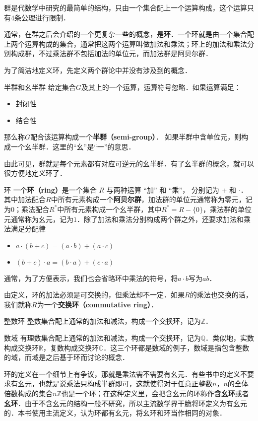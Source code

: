 

群是代数学中研究的最简单的结构，只由一个集合配上一个运算构成，这个运算只有$4$条公理进行限制．

通常，在群之后会介绍的一个更复杂一些的概念，是\textbf{环}．一个环就是由一个集合配上两个运算构成的集合，通常把这两个运算叫做加法和乘法；环上的加法和乘法分别构成群，不过乘法群不包括加法的单位元，而加法群是阿贝尔群．

为了简洁地定义环，先定义两个群论中并没有涉及到的概念．

\begin{definition}{半群和幺半群}
给定集合$G$及其上的一个运算，运算符号忽略．如果运算满足：
\begin{itemize}
\item 封闭性
\item 结合性
\end{itemize}
那么称$G$配合该运算构成一个\textbf{半群（semi-group）}．
如果半群中含单位元，则构成一个幺半群．这里的“幺”是“一”的意思．
\end{definition}

由此可见，群就是每个元素都有对应可逆元的幺半群．有了幺半群的概念，就可以很方便地定义环了．

\begin{definition}{环}
一个\textbf{环（ring）}是一个集合 $R$ 与两种运算 “加” 和 “乘”， 分别记为 $+$ 和 $\cdot$． 其中加法配合$R$中所有元素构成一个\textbf{阿贝尔群}，加法群的单位元通常称为零元，记为$0$；乘法配合$R^*$中所有元素构成一个幺半群，其中$R^*=R-\{0\}$，乘法群的单位元通常称为幺元，记为$1$．除了加法和乘法分别构成两个群之外，还要求加法和乘法满足分配律
\begin{itemize}
\item $a \cdot (b + c) = (a \cdot b) + (a \cdot c)$
\item $(b + c) \cdot a = (b \cdot a) + (c \cdot a)$
\end{itemize}
\end{definition}

通常，为了方便表示，我们也会省略环中乘法的符号，将$a\cdot b$写为$ab$．

由定义，环的加法必须是可交换的，但乘法却不一定．如果$R$的乘法也交换的话，我们就称$R$为一个\textbf{交换环（commutative ring）}．

\begin{example}{整数环}
整数集合配上通常的加法和减法，构成一个交换环，记为$\mathbb{Z}$．
\end{example}

\begin{example}{数域}
有理数集合配上通常的加法和减法，构成一个交换环，记为$\mathbb{Q}$．类似地，实数构成交换环$\mathbb{R}$，复数构成交换环$\mathbb{C}$．这三个环都是数域的例子，数域是指包含整数的域，而域是之后基于环而讨论的概念．
\end{example}

环的定义在一个细节上有争议，那就是乘法需不需要有幺元．有些书中的定义不要求有幺元，也就是说乘法只构成半群即可，这就使得对于任意正整数$n$，$n$的全体倍数构成的集合$n\mathbb{Z}$也是一个环；在这种定义里，会把含幺元的环称作\textbf{含幺环}或者\textbf{幺环}．由于不含幺元的结构一般不研究，所以主流数学界干脆将环定义为有幺元的．本书使用主流定义，认为环都有幺元，将幺环和环当作相同的对象．
